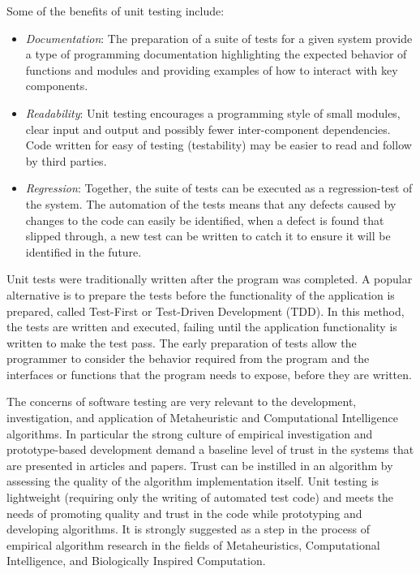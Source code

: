 Some of the benefits of unit testing include:

\begin{itemize}
  \item \emph{Documentation}: The preparation of a suite of tests for a given system provide a type of programming documentation highlighting the expected behavior of functions and modules and providing examples of how to interact with key components.
  \item \emph{Readability}: Unit testing encourages a programming style of small modules, clear input and output and possibly fewer inter-component dependencies. Code written for easy of testing (testability) may be easier to read and follow by third parties.
  \item \emph{Regression}: Together, the suite of tests can be executed as a regression-test of the system. The automation of the tests means that any defects caused by changes to the code can easily be identified, when a defect is found that slipped through, a new test can be written to catch it to ensure it will be identified in the future.
\end{itemize}

Unit tests were traditionally written after the program was completed. A popular alternative is to prepare the tests before the functionality of the application is prepared, called Test-First or Test-Driven Development (TDD). In this method, the tests are written and executed, failing until the application functionality is written to make the test pass. The early preparation of tests allow the programmer to consider the behavior required from the program and the interfaces or functions that the program needs to expose, before they are written. 

The concerns of software testing are very relevant to the development, investigation, and application of Metaheuristic and Computational Intelligence algorithms. In particular the strong culture of empirical investigation and prototype-based development demand a baseline level of trust in the systems that are presented in articles and papers. Trust can be instilled in an algorithm by assessing the quality of the algorithm implementation itself. 
Unit testing is lightweight (requiring only the writing of automated test code) and meets the needs of promoting quality and trust in the code while prototyping and developing algorithms. It is strongly suggested as a step in the process of empirical algorithm research in the fields of Metaheuristics, Computational Intelligence, and Biologically Inspired Computation.

